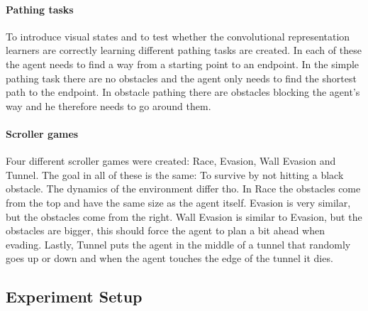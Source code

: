\paragraph{Pathing tasks}
To introduce visual states and to test whether the convolutional representation learners are correctly learning different pathing tasks are created. In each of these the agent needs to find a way from a starting point to an endpoint. In the simple pathing task there are no obstacles and the agent only needs to find the shortest path to the endpoint. In obstacle pathing there are obstacles blocking the agent's way and he therefore needs to go around them.

\paragraph{Scroller games}
Four different scroller games were created: Race, Evasion, Wall Evasion and Tunnel. The goal in all of these is the same: To survive by not hitting a black obstacle. The dynamics of the environment differ tho. In Race the obstacles come from the top and have the same size as the agent itself. Evasion is very similar, but the obstacles come from the right. Wall Evasion is similar to Evasion, but the obstacles are bigger, this should force the agent to plan a bit ahead when evading. Lastly, Tunnel puts the agent in the middle of a tunnel that randomly goes up or down and when the agent touches the edge of the tunnel it dies.

\subsection{Experiment Setup}
